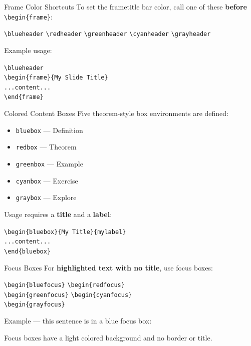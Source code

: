 \blueheader
\begin{frame}{Frame Color Shortcuts}
To set the frametitle bar color, call one of these \textbf{before} \texttt{\textbackslash begin\{frame\}}:
\medskip
\begin{bluefocus}
\texttt{\textbackslash blueheader} \quad
\texttt{\textbackslash redheader} \quad
\texttt{\textbackslash greenheader} \quad
\texttt{\textbackslash cyanheader} \quad
\texttt{\textbackslash grayheader}
\end{bluefocus}
\medskip
Example usage:
\begin{bluefocus}
\texttt{\textbackslash blueheader}\\
\texttt{\textbackslash begin\{frame\}\{My Slide Title\}}\\
\quad \texttt{...content...}\\
\texttt{\textbackslash end\{frame\}}
\end{bluefocus}
\end{frame}

\blueheader
\begin{frame}{Colored Content Boxes}
Five theorem-style box environments are defined:
\medskip
\begin{itemize}
  \item \texttt{bluebox} --- Definition
  \item \texttt{redbox} --- Theorem
  \item \texttt{greenbox} --- Example
  \item \texttt{cyanbox} --- Exercise
  \item \texttt{graybox} --- Explore
\end{itemize}
\medskip
Usage requires a \textbf{title} and a \textbf{label}:
\begin{bluefocus}
\texttt{\textbackslash begin\{bluebox\}\{My Title\}\{mylabel\}}\\
\quad \texttt{...content...}\\
\texttt{\textbackslash end\{bluebox\}}
\end{bluefocus}
\end{frame}

\blueheader
\begin{frame}{Focus Boxes}
For \textbf{highlighted text with no title}, use focus boxes:
\medskip
\begin{bluefocus}
\texttt{\textbackslash begin\{bluefocus\}} \quad \texttt{\textbackslash begin\{redfocus\}}\\
\texttt{\textbackslash begin\{greenfocus\}} \quad \texttt{\textbackslash begin\{cyanfocus\}}\\
\texttt{\textbackslash begin\{grayfocus\}}
\end{bluefocus}
\medskip
Example --- this sentence is in a blue focus box:
\begin{bluefocus}
  Focus boxes have a light colored background and no border or title.
\end{bluefocus}
\end{frame}

